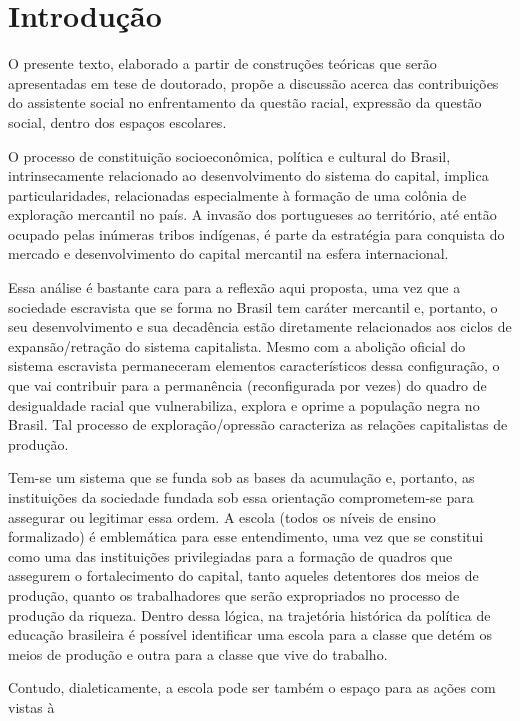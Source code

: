 \section*{Introdução}\par O presente texto, elaborado a partir de construções teóricas que serão apresentadas em
 tese de doutorado, propõe a discussão acerca das contribuições do assistente social no
 enfrentamento da questão racial, expressão da questão social, dentro dos espaços
 escolares.\par O processo de constituição socioeconômica, política e cultural do Brasil,
 intrinsecamente relacionado ao desenvolvimento do sistema do capital, implica
 particularidades, relacionadas especialmente à formação de uma colônia de exploração
 mercantil no país. A invasão dos portugueses ao território, até então ocupado pelas
 inúmeras tribos indígenas, é parte da estratégia para conquista do mercado e
 desenvolvimento do capital mercantil na esfera internacional.\par Essa análise é bastante cara para a reflexão aqui proposta, uma vez que a sociedade
 escravista que se forma no Brasil tem caráter mercantil e, portanto, o seu
 desenvolvimento e sua decadência estão diretamente relacionados aos ciclos de
 expansão/retração do sistema capitalista. Mesmo com a abolição oficial do sistema
 escravista permaneceram elementos característicos dessa configuração, o que vai
 contribuir para a permanência (reconfigurada por vezes) do quadro de desigualdade racial
 que vulnerabiliza, explora e oprime a população negra no Brasil. Tal processo de
 exploração/opressão caracteriza as relações capitalistas de produção.\par Tem-se um sistema que se funda sob as bases da acumulação e, portanto, as instituições
 da sociedade fundada sob essa orientação comprometem-se para assegurar ou legitimar essa
 ordem. A escola (todos os níveis de ensino formalizado) é emblemática para esse
 entendimento, uma vez que se constitui como uma das instituições privilegiadas para a
 formação de quadros que assegurem o fortalecimento do capital, tanto aqueles detentores
 dos meios de produção, quanto os trabalhadores que serão expropriados no processo de
 produção da riqueza. Dentro dessa lógica, na trajetória histórica da política de
 educação brasileira é possível identificar uma escola para a classe que detém os meios
 de produção e outra para a classe que vive do trabalho.\par Contudo, dialeticamente, a escola pode ser também o espaço para as ações com vistas à
